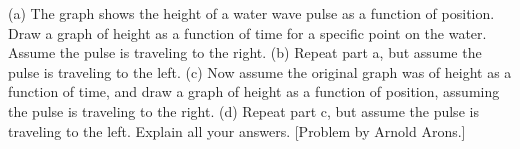 (a) The graph shows the height of a water wave pulse as a
function of position.  Draw a graph of height as a function
of time for a specific point on the water.  Assume the pulse
is traveling to the right.\hwendpart
(b) Repeat part a, but assume the pulse is traveling to the
left.\hwendpart
(c) Now assume the original graph was of height as a
function of time, and draw a graph of height as a function
of position, assuming the pulse is traveling to the right.\hwendpart
(d) Repeat part c, but assume the pulse is traveling to the
left.\hwendpart
Explain all your answers. [Problem by Arnold Arons.]
